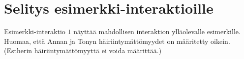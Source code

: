\section*{Selitys esimerkki-interaktioille}

Esimerkki-interaktio $1$ näyttää mahdollisen interaktion ylläolevalle esimerkille.
Huomaa, että Annan ja Tonyn häiriintymättömyydet on määritetty oikein. 
(Estherin häiriintymättömyyttä ei voida määrittää.)

